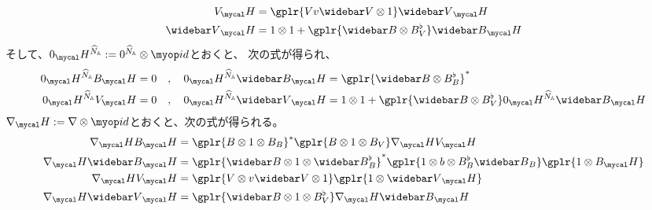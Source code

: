 {\begin{equation*}
\begin{split}
		V_\Eta &= \gplr{Vv\wbar{V}\otimes 1}\wbar{V}_\Eta \\
		\wbar{V}_\Eta &= 1\otimes1
			+ \gplr{\wbar{B}\otimes B_V^\flat}\wbar{B}_\Eta \\
	\end{split}\end{equation*}
	そして、$0_\Eta^{\Nhat_\setA} :=0^{\Nhat_\setA}\otimes\id$とおくと、
	次の式が得られ、
	\begin{alignat*}{2}
		0_\Eta^{\Nhat_\setA} B_\Eta &= 0
		&,\quad 0_\Eta^{\Nhat_\setA} \wbar{B}_\Eta 
		&= \gplr{\wbar{B}\otimes B_B^\flat}^* \\
		0_\Eta^{\Nhat_\setA} V_\Eta &= 0
		&,\quad 0_\Eta^{\Nhat_\setA} \wbar{V}_\Eta
		&= 1\otimes 1 + \gplr{\wbar{B}\otimes B_V^\flat}
			0_\Eta^{\Nhat_\setA} \wbar{B}_\Eta
	\end{alignat*}
	$\nabla_\Eta :=\nabla\otimes\id$とおくと、次の式が得られる。
	\begin{equation*}\begin{split}
		\nabla_\Eta B_\Eta &= \gplr{B\otimes 1\otimes B_B}^*
			\gplr{B\otimes 1\otimes B_V}\nabla_\Eta V_\Eta \\
		\nabla_\Eta \wbar{B}_\Eta
		&= \gplr{\wbar{B}\otimes 1\otimes \wbar{B}_B^\flat}^*
			\gplr{1\otimes b\otimes B_B^\flat\wbar{B}_B}
			\gplr{1\otimes B_\Eta} \\
		\nabla_\Eta V_\Eta &= \gplr{V\otimes v\wbar{V}\otimes 1}
			\gplr{1\otimes \wbar{V}_\Eta} \\
		\nabla_\Eta \wbar{V}_\Eta 
		&= \gplr{\wbar{B}\otimes 1\otimes B_V^\flat}\nabla_\Eta \wbar{B}_\Eta
	\end{split}\end{equation*}
}
